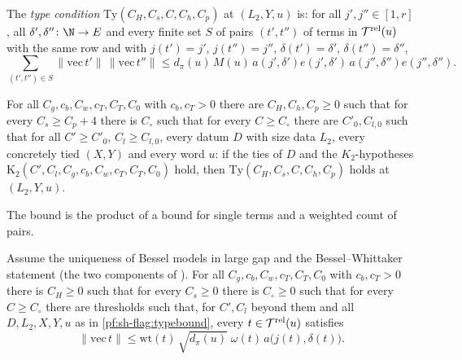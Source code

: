 \begin{definition}\label{pf:sh-flag:typecond}
The \emph{type condition} $\mathrm{Ty}(C_H,C_s,C,C_h,C_p)$ at $(L_2,Y,u)$ is: for all $j',j''\in[1,r]$, all
$\delta',\delta''\colon\N\to E$ and every finite set $S$ of pairs $(t',t'')$ of terms in $\mathcal T^{\mathrm{rel}}(u)$ with the same row and with
$j(t')=j'$, $j(t'')=j''$, $\delta(t')=\delta'$, $\delta(t'')=\delta''$,
\[
\sum_{(t',t'')\in S}\|\mathrm{vec}\,t'\|\,\|\mathrm{vec}\,t''\|\le d_\pi(u)\,M(u)\,a(j',\delta')e(j',\delta')\,a(j'',\delta'')e(j'',\delta'').
\]
\end{definition}

\begin{theorem}\label{pf:sh-flag:typebound}
For all $C_g,c_b,C_w,c_T,C_T,C_0$ with $c_b,c_T>0$ there are $C_H,C_h,C_p\ge0$ such that for every $C_s\ge C_p+4$ there is
$C_\circ$ such that for every $C\ge C_\circ$ there are $C'_0,C_{l,0}$ such that for all $C'\ge C'_0$, $C_l\ge C_{l,0}$, every
datum $D$ with size data $L_2$, every concretely tied $(X,Y)$ and every word $u$: if the ties of $D$ and the $K_2$-hypotheses
$\mathrm{K}_2(C',C_l,C_g,c_b,C_w,c_T,C_T,C_0)$ hold, then $\mathrm{Ty}(C_H,C_s,C,C_h,C_p)$ holds at $(L_2,Y,u)$.
\end{theorem}

The bound is the product of a bound for single terms and a weighted count of pairs.

\begin{proposition}\label{pf:sh-flag:amp}
Assume the uniqueness of Bessel models in large gap and the Bessel--Whittaker statement (the two components of
). For all $C_g,c_b,C_w,c_T,C_T,C_0$ with
$c_b,c_T>0$ there is $C_H\ge0$ such that for every $C_s\ge0$ there is $C_\circ\ge0$ such that for every $C\ge C_\circ$ there are
thresholds such that, for $C',C_l$ beyond them and all $D,L_2,X,Y,u$ as in \cref{pf:sh-flag:typebound}, every
$t\in\mathcal T^{\mathrm{rel}}(u)$ satisfies
\begin{equation}\label{pf:sh-flag:eq:amp}
\|\mathrm{vec}\,t\|\le\mathrm{wt}(t)\,\sqrt{d_\pi(u)}\;\omega(t)\,a\bigl(j(t),\delta(t)\bigr).
\end{equation}
\end{proposition}

